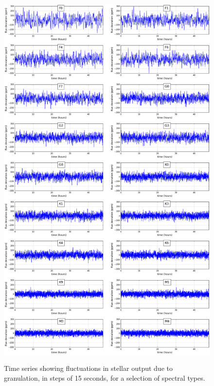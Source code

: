 \documentclass[11pt]{article}      %
\begin{document}
\begin{figure}[hbtp]
\begin{center}
    {\includegraphics[width=\textwidth]{granulation_kallinger_Jul2018.png}}
    \fi
    \caption{Time series showing fluctuations in stellar output due to granulation, in steps of 15 seconds, for a selection of spectral types.}
    \label{fig:granulation}
  \end{center}
\end{figure}
\end{document}
